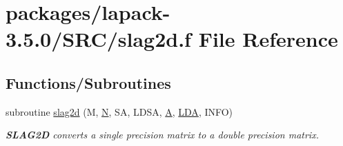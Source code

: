 \hypertarget{slag2d_8f}{}\section{packages/lapack-\/3.5.0/\+S\+R\+C/slag2d.f File Reference}
\label{slag2d_8f}
\subsection*{Functions/\+Subroutines}
\begin{DoxyCompactItemize}
\item 
subroutine \hyperlink{group__auxOTHERauxiliary_gac8ea5cb7fd597f6b5ae9cade02d122b3}{slag2d} (M, \hyperlink{polmisc_8c_a0240ac851181b84ac374872dc5434ee4}{N}, S\+A, L\+D\+S\+A, \hyperlink{classA}{A}, \hyperlink{example__user_8c_ae946da542ce0db94dced19b2ecefd1aa}{L\+D\+A}, I\+N\+F\+O)
\begin{DoxyCompactList}\small\item\em {\bfseries S\+L\+A\+G2\+D} converts a single precision matrix to a double precision matrix. \end{DoxyCompactList}\end{DoxyCompactItemize}

